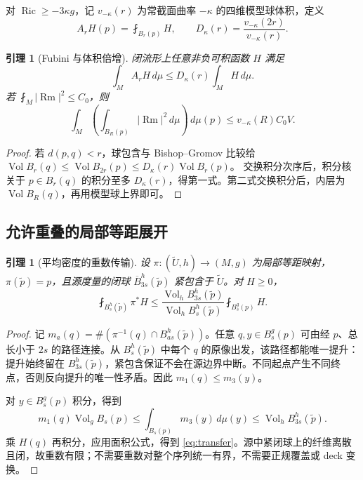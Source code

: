 \documentclass[UTF8,fontset=fandol,zihao=-4]{ctexart}
\theoremstyle{cn}
\newtheorem{lemma}[theorem]{引理}
\DeclareMathOperator{\Ric}{Ric}
\DeclareMathOperator{\Rm}{Rm}
\DeclareMathOperator{\Vol}{Vol}
\newcommand{\dd}{\,d\mu}
\newcommand{\av}{\fint}
\numberwithin{equation}{section}
\begin{document}
对 $\Ric\ge-3\kappa g$，记 $v_{-\kappa}(r)$ 为常截面曲率 $-\kappa$ 的四维模型球体积，定义
\[
A_rH(p)=\av_{B_r(p)}H,\qquad
D_\kappa(r)=\frac{v_{-\kappa}(2r)}{v_{-\kappa}(r)}.
\]
\begin{lemma}[Fubini 与体积倍增]\label{lem:fubini}
闭流形上任意非负可积函数 $H$ 满足
\begin{equation}\label{eq:average-fubini}
\int_M A_rH\dd\le D_\kappa(r)\int_MH\dd.
\end{equation}
若 $\av_M|\Rm|^2\le C_0$，则
\begin{equation}\label{eq:absolute-fubini}
\int_M\left(\int_{B_R(p)}|\Rm|^2\dd\right)\dd(p)
\le v_{-\kappa}(R)C_0V.
\end{equation}
\end{lemma}
\begin{proof}
若 $d(p,q)<r$，球包含与 Bishop--Gromov 比较给
$\Vol B_r(q)\le\Vol B_{2r}(p)\le D_\kappa(r)\Vol B_r(p)$。
交换积分次序后，积分核关于 $p\in B_r(q)$ 的积分至多 $D_\kappa(r)$，得第一式。第二式交换积分后，内层为 $\Vol B_R(q)$，再用模型球上界即可。
\end{proof}

\subsection{允许重叠的局部等距展开}

\begin{lemma}[平均密度的重数传输]\label{lem:transfer}
设 $\pi:(\widetilde U,h)\to(M,g)$ 为局部等距映射，$\pi(\tilde p)=p$，且源度量的闭球 $\overline B^h_{3s}(\tilde p)$ 紧包含于 $\widetilde U$。对 $H\ge0$，
\begin{equation}\label{eq:transfer}
\av_{B_s^h(\tilde p)}\pi^*H
\le\frac{\Vol_h B_{3s}^h(\tilde p)}{\Vol_h B_s^h(\tilde p)}\av_{B_s^g(p)}H.
\end{equation}
\end{lemma}
\begin{proof}
记 $m_a(q)=\#(\pi^{-1}(q)\cap B_{as}^h(\tilde p))$。任意 $q,y\in B_s^g(p)$ 可由经 $p$、总长小于 $2s$ 的路径连接。从 $B_s^h(\tilde p)$ 中每个 $q$ 的原像出发，该路径都能唯一提升：提升始终留在 $B_{3s}^h(\tilde p)$，紧包含保证不会在源边界中断。不同起点产生不同终点，否则反向提升的唯一性矛盾。因此 $m_1(q)\le m_3(y)$。

对 $y\in B_s^g(p)$ 积分，得到
\[
m_1(q)\Vol_gB_s(p)\le\int_{B_s(p)}m_3(y)\dd(y)
\le\Vol_hB_{3s}^h(\tilde p).
\]
乘 $H(q)$ 再积分，应用面积公式，得到 \eqref{eq:transfer}。源中紧闭球上的纤维离散且闭，故重数有限；不需要重数对整个序列统一有界，不需要正规覆盖或 deck 变换。
\end{proof}
\end{document}
